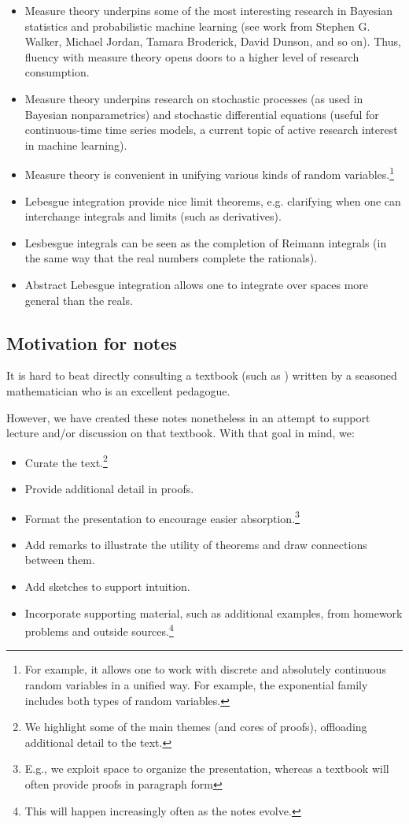 \documentclass{article} %
\begin{document}
\begin{itemize}
\item Measure theory underpins some of the most interesting research in Bayesian statistics and probabilistic machine learning (see work from Stephen G. Walker, Michael Jordan, Tamara Broderick, David Dunson, and so on).   Thus, fluency with measure theory opens doors to a higher level of research consumption. 
\item Measure theory underpins research on stochastic processes (as used in Bayesian nonparametrics) and stochastic differential equations (useful for continuous-time time series models, a current topic of active research interest in machine learning). 
\item Measure theory is convenient in unifying various kinds of random variables.\footnote{For example, it allows one to work with discrete and absolutely continuous random variables in a unified way.  For example, the exponential family includes both types of random variables.}
\item Lebesgue integration provide nice limit theorems, e.g. clarifying when one can interchange integrals and limits (such as derivatives).   
\item Lesbesgue integrals can be seen as the completion of Reimann integrals (in the same way that the real numbers complete the rationals).
\item Abstract Lebesgue integration allows one to integrate over spaces more general than the reals. 

\end{itemize}



\subsection{Motivation for notes}

It is hard to beat directly consulting a textbook (such as \cite{ash2000probability}) written by a seasoned mathematician who is an excellent pedagogue.

However, we have created these notes nonetheless in an attempt to support lecture and/or discussion on that textbook.   With that goal in mind, we:
\begin{itemize}
\item Curate the text.\footnote{We highlight some of the main themes (and cores of proofs), offloading additional detail to the text.} 
\item Provide additional detail in proofs.
\item Format the presentation to encourage easier absorption.\footnote{E.g., we exploit space to organize the presentation, whereas a textbook will often provide proofs in paragraph form}
\item Add remarks to illustrate the utility of theorems and draw connections between them.
\item Add sketches to support intuition.
\item Incorporate supporting material, such as additional examples, from homework problems and outside sources.\footnote{This will happen increasingly often as the notes evolve.}
\end{itemize}
\end{document}
